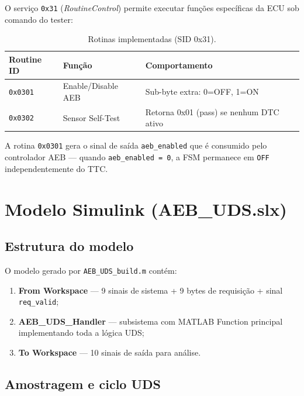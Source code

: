 \documentclass[12pt,a4paper]{article}
\newcommand{\sid}[1]{\texttt{0x#1}}
\begin{document}
O serviço \sid{31} (\textit{RoutineControl}) permite executar funções
específicas da ECU sob comando do tester:

\begin{table}[H]
    \centering
    \caption{Rotinas implementadas (SID 0x31).}
    \label{tab:rotinas}
    \begin{tabular}{@{}lll@{}}
        \toprule
        Routine ID & Função & Comportamento \\
        \midrule
        \texttt{0x0301} & Enable/Disable AEB & Sub-byte extra: 0=OFF, 1=ON \\
        \texttt{0x0302} & Sensor Self-Test & Retorna 0x01 (pass) se nenhum DTC ativo \\
        \bottomrule
    \end{tabular}
\end{table}

A rotina \texttt{0x0301} gera o sinal de saída \texttt{aeb\_enabled} que
é consumido pelo controlador AEB --- quando \texttt{aeb\_enabled = 0},
a FSM permanece em \texttt{OFF} independentemente do TTC.

\section{Modelo Simulink (AEB\_UDS.slx)}
\label{sec:simulink}

\subsection{Estrutura do modelo}

O modelo gerado por \texttt{AEB\_UDS\_build.m} contém:

\begin{enumerate}[noitemsep]
    \item \textbf{From Workspace} --- 9 sinais de sistema + 9 bytes de
          requisição + sinal \texttt{req\_valid};
    \item \textbf{AEB\_UDS\_Handler} --- subsistema com MATLAB Function
          principal implementando toda a lógica UDS;
    \item \textbf{To Workspace} --- 10 sinais de saída para análise.
\end{enumerate}

\subsection{Amostragem e ciclo UDS}
\end{document}
